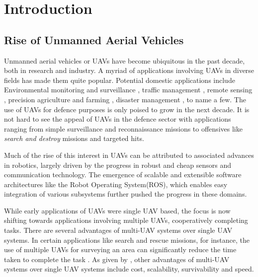 
\chapter{Introduction} %

\label{ChapterX} %



\section{Rise of Unmanned Aerial Vehicles}
Unmanned aerial vehicles or UAVs have become ubiquitous in the past decade, both in research and industry. A myriad of applications involving UAVs in diverse fields has made them quite popular. Potential domestic  applications include Environmental monitoring and surveillance \cite{envmon}, traffic management \cite{trasur}, remote sensing \cite{remsen}, precision agriculture and farming \cite{preagr}, disaster management \cite{disman}, to name a few. The use of UAVs for defence purposes is only poised to grow in the next decade. It is not hard to see the appeal of UAVs in the defence sector with applications ranging from simple surveillance and reconnaissance missions to offensives like \textit{search and destroy} missions and targeted hits.

Much of the rise of this interest in UAVs can be attributed to associated advances in robotics, largely driven by the progress in robust and cheap sensors and communication technology. The emergence of scalable and extensible software architectures like the Robot Operating System(ROS), which enables easy integration of various subsystems further pushed the progress in these domains.

While early applications of UAVs were single UAV based, the focus is now shifting towards applications involving multiple UAVs, cooperatively completing tasks. There are several advantages of multi-UAV systems over single UAV systems. In certain applications like search and rescue missions, for instance, the use of multiple UAVs for surveying an area can significantly reduce the time taken to complete the task \cite{coosea}. As given by \cite{fanets}, other advantages of multi-UAV systems over single UAV systems include cost, scalability, survivability and speed.

